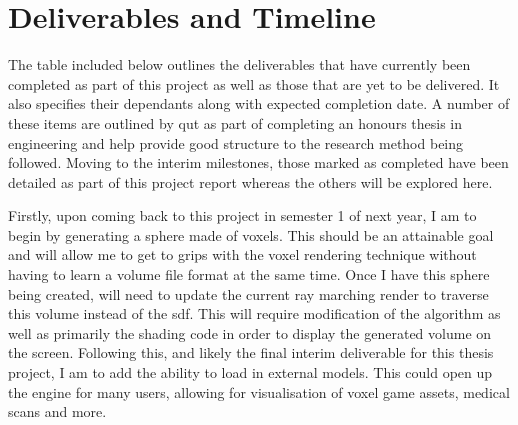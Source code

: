 \documentclass[titlepage]{article}
\begin{document}
\section{Deliverables and Timeline}
The table included below outlines the deliverables that have currently been completed as part of this project as well as those that are yet to be delivered. It also specifies their dependants along with expected completion date. A number of these items are outlined by \acrshort{qut} as part of completing an honours thesis in engineering and help provide good structure to the research method being followed. Moving to the interim milestones, those marked as completed have been detailed as part of this project report whereas the others will be explored here.

Firstly, upon coming back to this project in semester 1 of next year, I am to begin by generating a sphere made of voxels. This should be an attainable goal and will allow me to get to grips with the voxel rendering technique without having to learn a volume file format at the same time. Once I have this sphere being created, will need to update the current ray marching render to traverse this volume instead of the \acrshort{sdf}. This will require modification of the algorithm as well as primarily the shading code in order to display the generated volume on the screen. Following this, and likely the final interim deliverable for this thesis project, I am to add the ability to load in external models. This could open up the engine for many users, allowing for visualisation of voxel game assets, medical scans and more.
\end{document}
